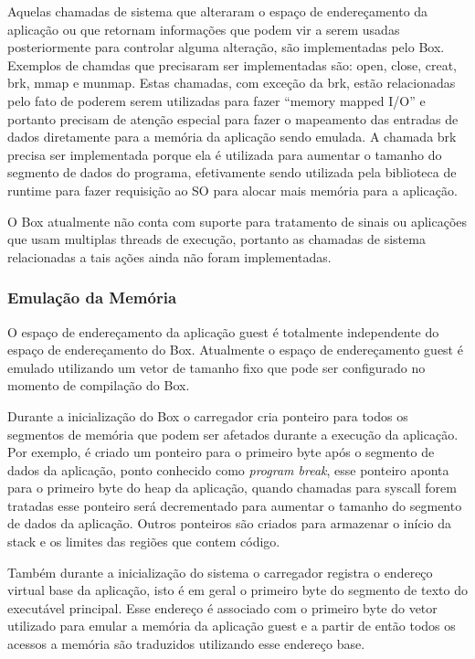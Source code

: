 \documentclass[11pt,twoside]{article}
\begin{document}
Aquelas chamadas de sistema que alteraram o espaço de endereçamento da 
aplicação ou que retornam informações que podem vir a serem usadas 
posteriormente para controlar alguma alteração, são implementadas pelo Box. 
Exemplos de chamdas que precisaram ser implementadas são: open, close, creat,
brk, mmap e munmap. Estas chamadas, com exceção da brk, estão relacionadas 
pelo fato de poderem serem utilizadas para fazer ``memory mapped I/O'' e 
portanto precisam de atenção especial para fazer o mapeamento das entradas
de dados diretamente para a memória da aplicação sendo emulada. A chamada
brk precisa ser implementada porque ela é utilizada para aumentar o tamanho
do segmento de dados do programa, efetivamente sendo utilizada pela biblioteca
de runtime para fazer requisição ao SO para alocar mais memória para a
aplicação.

O Box atualmente não conta com suporte para tratamento de sinais ou 
aplicações que usam multiplas threads de execução, portanto as chamadas
de sistema relacionadas a tais ações ainda não foram implementadas.

\subsubsection{Emulação da Memória}

O espaço de endereçamento da aplicação guest é totalmente independente
do espaço de endereçamento do Box. Atualmente o espaço de endereçamento
guest é emulado utilizando um vetor de tamanho fixo que pode ser configurado
no momento de compilação do Box.

Durante a inicialização do Box o carregador cria ponteiro para todos os
segmentos de memória que podem ser afetados durante a execução da aplicação.
Por exemplo, é criado um ponteiro para o primeiro byte após o segmento de
dados da aplicação, ponto conhecido como \textit{program break}, esse 
ponteiro aponta para o primeiro byte do heap da aplicação, quando chamadas
para syscall forem tratadas esse ponteiro será decrementado para aumentar
o tamanho do segmento de dados da aplicação. Outros ponteiros são criados
para armazenar o início da stack e os limites das regiões que contem código.

Também durante a inicialização do sistema o carregador registra o endereço
virtual base da aplicação, isto é em geral o primeiro byte do segmento de
texto do executável principal. Esse endereço é associado com o primeiro
byte do vetor utilizado para emular a memória da aplicação guest e a partir
de então todos os acessos a memória são traduzidos utilizando esse endereço
base.
\end{document}
